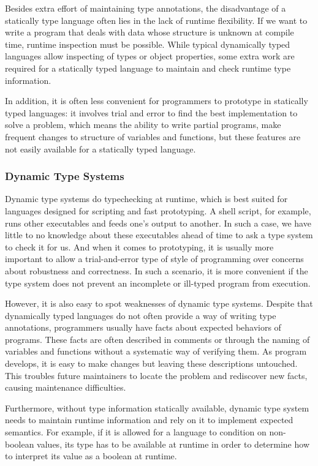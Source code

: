 Besides extra effort of maintaining type annotations,
the disadvantage of a statically type language often lies in the lack of runtime flexibility.
If we want to write a program that deals with data whose structure is
unknown at compile time, runtime inspection must be possible.
While typical dynamically typed languages allow inspecting of types or object properties,
some extra work are required for a statically typed language
to maintain and check runtime type information.

In addition, it is often less convenient for programmers to prototype
in statically typed languages: it involves trial and error to find the best implementation
to solve a problem, which means the ability to write partial programs,
make frequent changes to structure of variables and functions, but these features are not easily available for a statically typed language.

\subsubsection{Dynamic Type Systems}

Dynamic type systems do typechecking at runtime, which is best suited for
languages designed for scripting and fast prototyping.
A shell script, for example, runs other executables and feeds one's output to another.
In such a case, we have little to no knowledge about these executables ahead of time to ask a type system to check it for us.
And when it comes to prototyping,
it is usually more important to allow a trial-and-error type of style of programming
over concerns about robustness and correctness.
In such a scenario, it is more convenient if the type system does not prevent
an incomplete or ill-typed program from execution.

However, it is also easy to spot weaknesses of dynamic type systems.
Despite that dynamically typed languages do not often provide a way of writing type annotations,
programmers usually have facts about expected behaviors of programs.
These facts are often described in comments or through the naming of variables and functions without a systematic way of verifying them.
As program develops, it is easy to make changes but leaving these descriptions untouched.
This troubles future maintainers to locate the problem and rediscover new facts,
causing maintenance difficulties.

Furthermore, without type information statically available,
dynamic type system needs to maintain runtime information
and rely on it to implement expected semantics.
For example, if it is allowed for a language to condition on non-boolean values,
its type has to be available at runtime in order to
determine how to interpret its value as a boolean at runtime.

